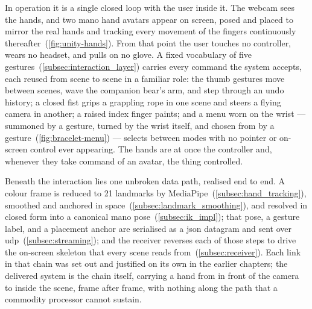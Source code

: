 In operation it is a single closed loop with the user inside it. The webcam sees
the hands, and two \acrshort{mano} hand avatars appear on screen, posed and placed
to mirror the real hands and tracking every movement of the fingers continuously
thereafter~(\autoref{fig:unity-hands}). From that point the user touches no
controller, wears no headset, and pulls on no glove. A fixed vocabulary of five
gestures~(\autoref{subsec:interaction_layer}) carries every command the system
accepts, each reused from scene to scene in a familiar role: the thumb gestures
move between scenes, wave the companion bear's arm, and step through an undo
history; a closed fist grips a grappling rope in one scene and steers a flying
camera in another; a raised index finger paints; and a menu worn on the wrist ---
summoned by a gesture, turned by the wrist itself, and chosen from by a
gesture~(\autoref{fig:bracelet-menu}) --- selects between modes with no pointer or
on-screen control ever appearing. The hands are at once the controller and,
whenever they take command of an avatar, the thing controlled.

Beneath the interaction lies one unbroken data path, realised end to end. A colour
frame is reduced to 21 landmarks by MediaPipe~(\autoref{subsec:hand_tracking}),
smoothed and anchored in space~(\autoref{subsec:landmark_smoothing}), and resolved
in closed form into a canonical \acrshort{mano} pose~(\autoref{subsec:ik_impl});
that pose, a gesture label, and a placement anchor are serialised as a
\acrshort{json} datagram and sent over \acrshort{udp}~(\autoref{subsec:streaming});
and the receiver reverses each of those steps to drive the on-screen skeleton that
every scene reads from~(\autoref{subsec:receiver}). Each link in that chain was set
out and justified on its own in the earlier chapters; the delivered system is the
chain itself, carrying a hand from in front of the camera to inside the scene,
frame after frame, with nothing along the path that a commodity processor cannot
sustain.

